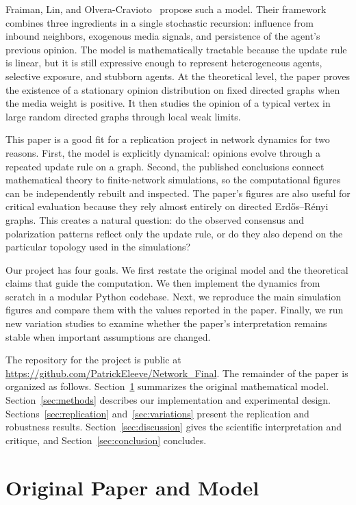 \documentclass[11pt]{article}
\begin{document}
Fraiman, Lin, and Olvera-Cravioto~\cite{fraiman2024opinion} propose such a
model.  Their framework combines three ingredients in a single stochastic
recursion: influence from inbound neighbors, exogenous media signals, and
persistence of the agent's previous opinion.  The model is mathematically
tractable because the update rule is linear, but it is still expressive enough
to represent heterogeneous agents, selective exposure, and stubborn agents.  At
the theoretical level, the paper proves the existence of a stationary opinion
distribution on fixed directed graphs when the media weight is positive.  It
then studies the opinion of a typical vertex in large random directed graphs
through local weak limits.

This paper is a good fit for a replication project in network dynamics for two
reasons.  First, the model is explicitly dynamical: opinions evolve through a
repeated update rule on a graph.  Second, the published conclusions connect
mathematical theory to finite-network simulations, so the computational figures
can be independently rebuilt and inspected.  The paper's figures are also useful
for critical evaluation because they rely almost entirely on directed
Erd\H{o}s--R\'enyi graphs.  This creates a natural question: do the observed
consensus and polarization patterns reflect only the update rule, or do they
also depend on the particular topology used in the simulations?

Our project has four goals.  We first restate the original model and the
theoretical claims that guide the computation.  We then implement the dynamics
from scratch in a modular Python codebase.  Next, we reproduce the
main simulation figures and compare them with the values reported in the paper.
Finally, we run new variation studies to examine whether the paper's
interpretation remains stable when important assumptions are changed.

The repository for the project is public at
\url{https://github.com/PatrickEleeve/Network_Final}.  The remainder of the
paper is organized as follows.  Section~\ref{sec:paper} summarizes the original
mathematical model.  Section~\ref{sec:methods} describes our implementation and
experimental design.  Sections~\ref{sec:replication} and~\ref{sec:variations}
present the replication and robustness results.  Section~\ref{sec:discussion}
gives the scientific interpretation and critique, and
Section~\ref{sec:conclusion} concludes.

\section{Original Paper and Model}
\label{sec:paper}
\end{document}
